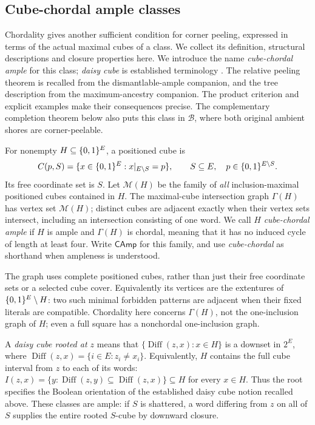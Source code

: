 \subsection{Cube-chordal ample classes}
\label{sec:cube-chordal}

Chordality gives another sufficient condition for corner peeling, expressed
in terms of the actual maximal cubes of a class. We collect its definition,
structural descriptions and closure properties here. We introduce the name
\emph{cube-chordal ample} for this class; \emph{daisy cube} is established
terminology \cite{KlavzarMollardDaisy}.
The relative peeling theorem is recalled from the dismantlable-ample
companion, and the tree description from the maximum-ancestry companion.
The product criterion and explicit examples make their consequences precise.
The complementary completion theorem below also puts this class in
$\mathcal B$, where both original ambient shores are corner-peelable.

\begin{definition}
\label{def:cube-chordal}
For nonempty $H\subseteq\{0,1\}^E$, a positioned cube is
\[
 C(p,S)=\{x\in\{0,1\}^E:x|_{E\setminus S}=p\},
 \qquad S\subseteq E,\quad p\in\{0,1\}^{E\setminus S}.
\]
Its free coordinate set is $S$. Let $\mathcal M(H)$ be the family of
\emph{all} inclusion-maximal positioned cubes contained in $H$.
The maximal-cube intersection graph $\Gamma(H)$ has vertex set
$\mathcal M(H)$; distinct cubes are adjacent exactly when their vertex
sets intersect, including an intersection consisting of one word.
We call $H$ \emph{cube-chordal ample} if $H$ is ample and $\Gamma(H)$
is chordal, meaning that it has no induced cycle of length at least four.
Write $\mathsf{CAmp}$ for this family, and use \emph{cube-chordal} as
shorthand when ampleness is understood.
\end{definition}

The graph uses complete positioned cubes, rather than just their free
coordinate sets or a selected cube cover. Equivalently its vertices are
the extentures of $\{0,1\}^E\setminus H$: two such minimal forbidden
patterns are adjacent when their fixed literals are compatible.
Chordality here concerns $\Gamma(H)$, not the one-inclusion graph of $H$;
even a full square has a nonchordal one-inclusion graph.

A \emph{daisy cube rooted at $z$} means that
$\{\operatorname{Diff}(z,x):x\in H\}$ is a downset in $2^E$,
where $\operatorname{Diff}(z,x)=\{i\in E:z_i\ne x_i\}$.
Equivalently, $H$ contains the full cube interval from $z$ to each of
its words: $I(z,x)=\{y:\operatorname{Diff}(z,y)\subseteq
\operatorname{Diff}(z,x)\}\subseteq H$ for every $x\in H$.
Thus the root specifies the Boolean orientation of the established daisy
cube notion recalled above. These classes are ample: if $S$ is shattered,
a word differing from $z$ on all of $S$ supplies the entire rooted
$S$-cube by downward closure.

